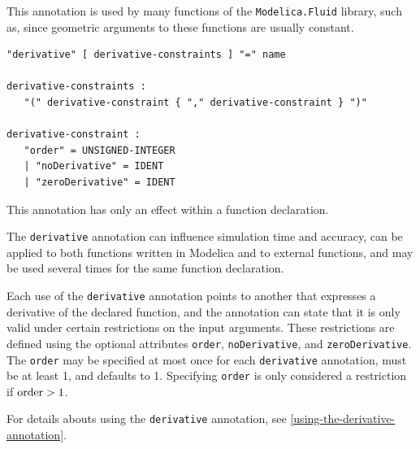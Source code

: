 \begin{annotationdefinition}[smoothOrder]
\begin{semantics}
\begin{nonnormative}
This annotation is used by many functions of the {\lstinline!Modelica.Fluid!} library, such as, since geometric arguments to these functions are usually constant.
\end{nonnormative}
\end{semantics}
\end{annotationdefinition}

\begin{annotationdefinition}[derivative]
\begin{synopsis}[grammar]\begin{lstlisting}
"derivative" [ derivative-constraints ] "=" name

derivative-constraints :
   "(" derivative-constraint { "," derivative-constraint } ")"

derivative-constraint :
   "order" = UNSIGNED-INTEGER
   | "noDerivative" = IDENT
   | "zeroDerivative" = IDENT
\end{lstlisting}\end{synopsis}
\begin{semantics}
This annotation has only an effect within a function declaration.

The {\lstinline!derivative!} annotation can influence simulation time and accuracy, can be applied to both functions written in Modelica and to external functions, and may be used several times for the same function declaration.

Each use of the {\lstinline!derivative!} annotation points to another  that expresses a derivative of the declared function, and the annotation can state that it is only valid under certain restrictions on the input arguments.
These restrictions are defined using the optional attributes {\lstinline!order!}, {\lstinline!noDerivative!}, and {\lstinline!zeroDerivative!}.
The {\lstinline!order!} may be specified at most once for each {\lstinline!derivative!} annotation, must be at least 1, and defaults to 1.
Specifying {\lstinline!order!} is only considered a restriction if $\text{{\lstinline!order!}} > 1$.

For details abouts using the {\lstinline!derivative!} annotation, see \cref{using-the-derivative-annotation}.
\end{semantics}
\end{annotationdefinition}

